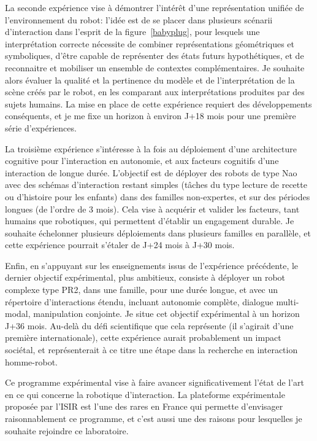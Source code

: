 \documentclass[a4paper]{article}
\begin{document}
La seconde expérience vise à démontrer l'intérêt d'une représentation unifiée de
l'environnement du robot: l'idée est de se placer dans plusieurs scénarii
d'interaction dans l'esprit de la figure~\ref{babyplug}, pour lesquels une
interprétation correcte nécessite de combiner représentations géométriques et
symboliques, d'être capable de représenter des états futurs hypothétiques, et de
reconnaitre et mobiliser un ensemble de contextes complémentaires. Je souhaite
alors évaluer la qualité et la pertinence du modèle et de l'interprétation de la
scène créés par le robot, en les comparant aux interprétations produites par des
sujets humains. La mise en place de cette expérience requiert des développements
conséquents, et je me fixe un horizon à environ J+18 mois pour une première
série d'expériences.

La troisième expérience s'intéresse à la fois au déploiement d'une architecture
cognitive pour l'interaction en autonomie, et aux facteurs cognitifs d'une
interaction de longue durée. L'objectif est de déployer des robots de type Nao avec
des schémas d'interaction restant simples (tâches du type lecture de recette ou
d'histoire pour les enfants) dans des familles non-expertes, et sur des
périodes longues (de l'ordre de 3 mois). Cela vise à acquérir et valider les
facteurs, tant humains que robotiques, qui permettent d'établir un engagement
durable.  Je souhaite échelonner plusieurs déploiements dans plusieurs familles
en parallèle, et cette expérience pourrait s'étaler de J+24 mois à J+30 mois.

Enfin, en s'appuyant sur les enseignements issus de l'expérience précédente, le
dernier objectif expérimental, plus ambitieux, consiste à déployer un robot
complexe type PR2, dans une famille, pour une durée longue, et avec un
répertoire d'interactions étendu, incluant autonomie complète, dialogue
multi-modal, manipulation conjointe. Je situe cet objectif expérimental à un
horizon J+36 mois. Au-delà du défi scientifique que cela représente (il
s'agirait d'une première internationale), cette expérience aurait probablement
un impact sociétal, et représenterait à ce titre une étape dans la recherche en
interaction homme-robot.

Ce programme expérimental vise à faire avancer significativement l'état de l'art
en ce qui concerne la robotique d'interaction. La plateforme expérimentale
proposée par l'ISIR est l'une des rares en France qui permette d'envisager
raisonnablement ce programme, et c'est aussi une des raisons pour lesquelles je
souhaite rejoindre ce laboratoire.
\end{document}
